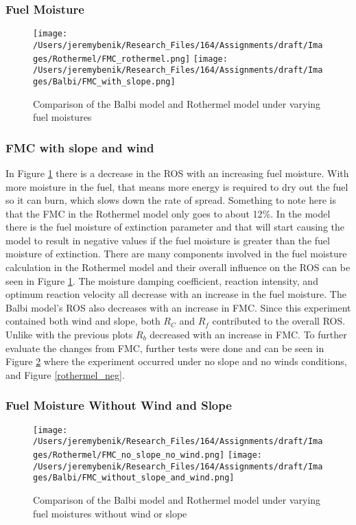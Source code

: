 \documentclass{article}
\begin{document}
\subsubsection{Fuel Moisture}
\begin{figure}
\centering
  \texttt{[image: /Users/jeremybenik/Research\_Files/164/Assignments/draft/Images/Rothermel/FMC\_rothermel.png]}
  \texttt{[image: /Users/jeremybenik/Research\_Files/164/Assignments/draft/Images/Balbi/FMC\_with\_slope.png]}
  \caption{Comparison of the Balbi model and Rothermel model under varying fuel moistures}
  \label{FMC}
\end{figure}
\subsubsection*{FMC with slope and wind}
\indent In Figure \ref{FMC} there is a decrease in the ROS with an increasing fuel moisture. With more moisture in the fuel, that means more energy is required to dry out the fuel so it can burn, which slows down the rate of spread. Something to note here is that the FMC in the Rothermel model only goes to about 12$\%$. In the model there is the fuel moisture of extinction parameter and that will start causing the model to result in negative values if the fuel moisture is greater than the fuel moisture of extinction. There are many components involved in the fuel moisture calculation in the Rothermel model and their overall influence on the ROS can be seen in Figure \ref{FMC}. The moisture damping coefficient, reaction intensity, and optimum reaction velocity all decrease with an increase in the fuel moisture. The Balbi model's ROS also decreases with an increase in FMC. Since this experiment contained both wind and slope, both $R_C$ and $R_f$ contributed to the overall ROS. Unlike with the previous plots $R_b$ decreased with an increase in FMC. To further evaluate the changes from FMC, further tests were done and can be seen in Figure \ref{balbi_vs_rother_fmc_no_wind_no_slope} where the experiment occurred under no slope and no winds conditions, and Figure \ref{rothermel_neg}. \\
\subsubsection*{Fuel Moisture Without Wind and Slope}
\begin{figure}
\centering
  \texttt{[image: /Users/jeremybenik/Research\_Files/164/Assignments/draft/Images/Rothermel/FMC\_no\_slope\_no\_wind.png]}
  \texttt{[image: /Users/jeremybenik/Research\_Files/164/Assignments/draft/Images/Balbi/FMC\_without\_slope\_and\_wind.png]}
  \caption{Comparison of the Balbi model and Rothermel model under varying fuel moistures without wind or slope}
  \label{balbi_vs_rother_fmc_no_wind_no_slope}
\end{figure}
\end{document}

